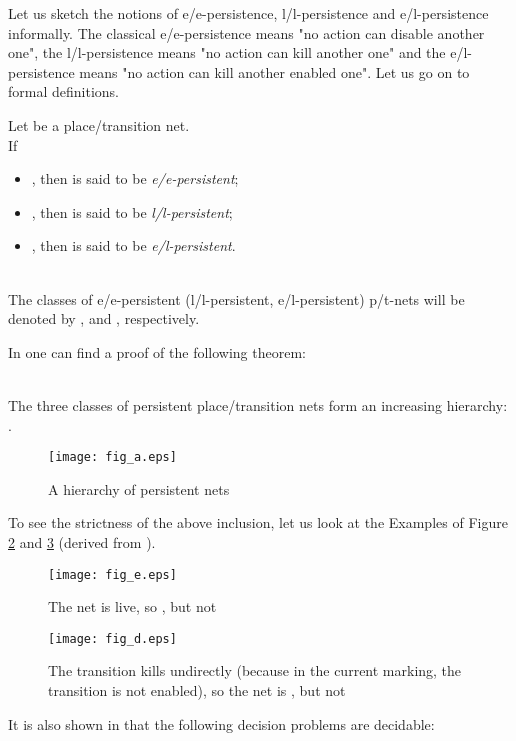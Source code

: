 \documentclass[a4paper]{llncs}
\begin{document}
\newpage
Let us sketch the notions of e/e-persistence, l/l-persistence and e/l-persistence informally. The classical e/e-persistence means "no action can disable another one", the l/l-persistence means "no action can kill another one" and the e/l-persistence means "no action can kill another enabled one". Let us go on to formal definitions.

\begin{definition}
\label{d31}
Let  be a place/transition net. \\
If  
\begin{itemize}
\item , then  is said to be \emph{e/e-persistent};
\item , then  is said to be \emph{l/l-persistent};
\item , then  is said to be \emph{e/l-persistent}.
\end{itemize}\mbox{}\\
The classes of e/e-persistent (l/l-persistent, e/l-persistent) p/t-nets will be denoted by ,  and , respectively.
\end{definition}
In \cite{BarOch} one can find a proof of the following theorem:
\begin{theorem}\mbox{}\\
\label{t_hier}
The three classes of persistent place/transition nets
form an increasing hierarchy: .
\end{theorem}
\begin{figure}[h]
\centering
\texttt{[image: fig\_a.eps]}
\caption{A hierarchy of persistent nets}
\label{FigA}
\end{figure}
\begin{example}
\label{ex_fig_e_d}
To see the strictness of the above inclusion, let us look at the Examples of Figure \ref{Fig_E} and \ref{Fig_D} (derived from \cite{BarOch}).
\end{example}
\begin{figure}[h]
\centering
\texttt{[image: fig\_e.eps]}
\caption{The net is live, so , but not  }
\label{Fig_E}
\end{figure}
\begin{figure}[h]
\centering
\texttt{[image: fig\_d.eps]}
\caption{The transition  kills  undirectly (because in the current marking, the transition  is not enabled), so the net is , but not  }
\label{Fig_D}
\end{figure}
It is also shown in \cite{BarOch} that the following decision problems are decidable:
\end{document}
